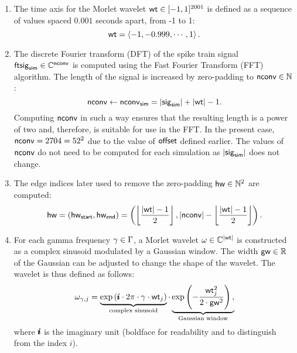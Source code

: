 \begin{enumerate}
    \item The time axis for the Morlet wavelet $\mathsf{wt} \in [-1, 1]^{2001}$ is defined as a sequence of values spaced $0.001$ seconds apart, from -1 to 1:
    \begin{equation}
        \mathsf{wt} = \left<
        -1, -0.999, \cdots, 1
        \right>.
    \end{equation}

    \item The discrete Fourier transform (DFT) of the spike train signal $\mathsf{ft}\mathsf{sig}_{\mathsf{sim}} \in \mathbb{C}^{\mathsf{nconv}}$ is computed using the Fast Fourier Transform (FFT) algorithm. The length of the signal is increased by zero-padding to $\mathsf{nconv} \in \mathbb{N}$:
    \begin{equation}
        \mathsf{nconv} \leftarrow \mathsf{nconv}_{\mathsf{sim}} = |\mathsf{sig}_{\mathsf{sim}}| + |\mathsf{wt}| - 1.
    \end{equation}
    Computing $\mathsf{nconv}$ in such a way ensures that the resulting length is a power of two and, therefore, is suitable for use in the FFT.
    In the present case, $\mathsf{nconv} = 2704 = 52^2$ due to the value of $\mathsf{offset}$ defined earlier.
    The values of $\mathsf{nconv}$ do not need to be computed for each simulation as $|\mathsf{sig}_{\mathsf{sim}}|$ does not change.

    \item The edge indices later used to remove the zero-padding $\mathsf{hw} \in \mathbb{N}^2$ are computed:
    \begin{equation}
        \mathsf{hw}
        = 
        (\mathsf{hw}_{\mathsf{start}}, \mathsf{hw}_{\mathsf{end}}) 
        =
        \left(
            \left\lfloor 
                \frac{
                    |\mathsf{wt}| - 1         
                }{2}
             \right\rfloor,
            |\mathsf{nconv}| - \left\lfloor 
                \frac{
                    |\mathsf{wt}| - 1         
                }{2}
             \right\rfloor
        \right).
    \end{equation}

    \item For each gamma frequency $\gamma \in \Gamma$, a Morlet wavelet $\omega \in \mathbb{C}^{|\mathsf{wt}|}$ is constructed as a complex sinusoid modulated by a Gaussian window. The width $\mathsf{gw} \in \mathbb{R}$ of the Gaussian can be adjusted to change the shape of the wavelet. The wavelet is thus defined as follows:
    \begin{equation}
        \omega_{\gamma, j} = 
        \underbrace{
            \exp \left(
            \pmb{i} \cdot 2 \pi \cdot \gamma \cdot \mathsf{wt}_j
            \right)
        }_{\text{complex sinusoid}}
        \cdot
        \underbrace{
            \exp \left(
                - \frac{
                    \mathsf{wt}_j^2
                }{
                    2 \cdot \mathsf{gw}^2
                }
            \right),
        }_{\text{Gaussian window}}
    \end{equation}
    where $\pmb{i}$ is the imaginary unit (boldface for readability and to distinguish from the index $i$).
    

\end{enumerate}
